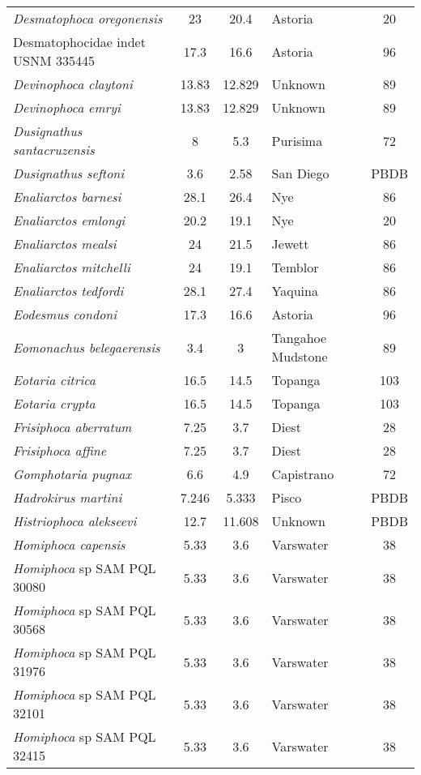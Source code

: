 \begin{longtable}{p{}cclc}
\textit{Desmatophoca oregonensis} & 	23	&	20.4	&	Astoria	&20\\
Desmatophocidae indet USNM 335445 & 	17.3	&	16.6	&	Astoria	&96\\
\textit{Devinophoca claytoni} & 	13.83	&	12.829	&	Unknown	&89\\
\textit{Devinophoca emryi} & 	13.83	&	12.829	&	Unknown	&89\\
\textit{Dusignathus santacruzensis} & 	8	&	5.3	&	Purisima	&72\\
\textit{Dusignathus seftoni} & 	3.6	&	2.58	&	San Diego	&PBDB\\
\textit{Enaliarctos barnesi} & 	28.1	&	26.4	&	Nye	&86\\
\textit{Enaliarctos emlongi} & 	20.2	&	19.1	&	Nye	&20\\
\textit{Enaliarctos mealsi} & 	24	&	21.5	&	Jewett	&86\\
\textit{Enaliarctos mitchelli} & 	24	&	19.1	&	Temblor	&86\\
\textit{Enaliarctos tedfordi} & 	28.1	&	27.4	&	Yaquina	&86\\
\textit{Eodesmus condoni} & 	17.3	&	16.6	&	Astoria	&96\\
\textit{Eomonachus belegaerensis} & 	3.4	&	3	&	Tangahoe Mudstone	&89\\
\textit{Eotaria citrica} & 	16.5	&	14.5	&	Topanga	&103\\
\textit{Eotaria crypta} & 	16.5	&	14.5	&	Topanga	&103\\
\textit{Frisiphoca aberratum} & 	7.25	&	3.7	&	Diest	&28\\
\textit{Frisiphoca affine} & 	7.25	&	3.7	&	Diest	&28\\
\textit{Gomphotaria pugnax} & 	6.6	&	4.9	&	Capistrano	&72\\
\textit{Hadrokirus martini} & 	7.246	&	5.333	&	Pisco	&PBDB\\
\textit{Histriophoca alekseevi} & 	12.7	&	11.608	&	Unknown	&PBDB\\
\textit{Homiphoca capensis} & 	5.33	&	3.6	&	Varswater	&38\\
\textit{Homiphoca} sp SAM PQL 30080 & 	5.33	&	3.6	&	Varswater	&38\\
\textit{Homiphoca} sp SAM PQL 30568 & 	5.33	&	3.6	&	Varswater	&38\\
\textit{Homiphoca} sp SAM PQL 31976 & 	5.33	&	3.6	&	Varswater	&38\\
\textit{Homiphoca} sp SAM PQL 32101 & 	5.33	&	3.6	&	Varswater	&38\\
\textit{Homiphoca} sp SAM PQL 32415 & 	5.33	&	3.6	&	Varswater	&38\\

\end{longtable}
